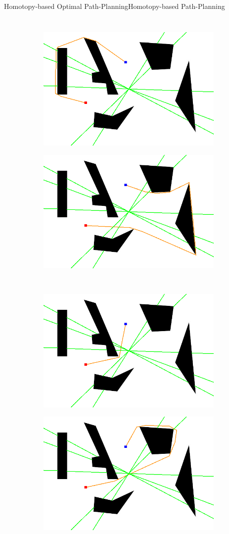 \begin{frame}{Homotopy-based Optimal Path-Planning}{Homotopy-based Path-Planning}
	
\begin{columns}
\begin{figure}
	\centering
	\begin{subfigure}
		\centering
		\includegraphics[width=.47\textwidth]{figure/all_homotopy_classes/s1.png}
	\end{subfigure}  
	\begin{subfigure}
		\centering
		\includegraphics[width=.47\textwidth]{figure/all_homotopy_classes/s2.png}
	\end{subfigure}
	\\
	\begin{subfigure}
		\centering
		\includegraphics[width=.47\textwidth]{figure/all_homotopy_classes/s3.png}
	\end{subfigure}  
	\begin{subfigure}
		\centering
		\includegraphics[width=.47\textwidth]{figure/all_homotopy_classes/s4.png}

\end{subfigure}
\end{figure}
\end{columns}
\end{frame}
